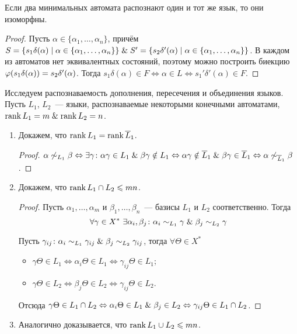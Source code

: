 \begin{statement}
Если два минимальных автомата распознают один и тот же язык, то они изоморфны.
\end{statement}
\begin{proof}
Пусть $\alpha \in \{ \alpha_1, \ldots, \alpha_n \}$, причём $S = \{ s_1 \delta(\alpha) \mid \alpha \in \{ \alpha_1, \ldots, \alpha_n \} \} \opbr\lAnd S' \opbr= \{ s_2 \delta'(\alpha) \mid \alpha \opbr\in \{ \alpha_1, \ldots, \alpha_n \} \}$.
В каждом из автоматов нет эквивалентных состояний, поэтому можно построить биекцию $\varphi(s_1 \delta(\alpha)) \opbr= s_2 \delta'(\alpha)$.
Тогда $s_1 \delta(\alpha) \in F \Leftrightarrow \alpha \in L \Leftrightarrow s_1' \delta'(\alpha) \in F$.
\end{proof}

Исследуем распознаваемость дополнения, пересечения и объединения языков.
Пусть $L_1$, $L_2$~--- языки, распознаваемые некоторыми конечными автоматами, $\operatorname{rank} L_1 = m \mathrel{\&} \operatorname{rank} L_2 = n$.
\begin{enumerate}
	\item Докажем, что $\operatorname{rank} L_1 = \operatorname{rank} \overline L_1$.
	\begin{proof}
	$\alpha \not\sim_{L_1} \beta \Leftrightarrow
	\exists \gamma \colon \alpha \gamma \in L_1 \mathrel{\&} \beta \gamma \notin L_1 \Leftrightarrow
	\alpha \gamma \notin \overline L_1 \mathrel{\&} \beta \gamma \in \overline L_1 \Leftrightarrow
	\alpha \not\sim_{\overline L_1} \beta$.
	\end{proof}
	
	\item Докажем, что $\operatorname{rank} L_1 \cap L_2 \leqslant mn$.
	\begin{proof}
	Пусть $\alpha_1, \ldots, \alpha_m$ и $\beta_1, \ldots, \beta_n$~--- базисы $L_1$ и $L_2$ соответственно.
	Тогда
	\begin{equation*}
	\forall \gamma \in X^* \ \exists \alpha_i, \beta_j \colon \alpha_i \sim_{L_1} \gamma \mathrel{\&} \beta_j \sim_{L_2} \gamma
	\end{equation*}
	
	Пусть $\gamma_{ij} \colon \alpha_i \sim_{L_1} \gamma_{ij} \mathrel{\&} \beta_j \sim_{L_2} \gamma_{ij}$, тогда $\forall \Theta \in X^*$
	\begin{itemize}
		\item $\gamma \Theta \in L_1 \Leftrightarrow
		\alpha_i \Theta \in L_1 \Leftrightarrow
		\gamma_{ij} \Theta \in L_1$;
		\item $\gamma \Theta \in L_2 \Leftrightarrow
		\beta_j \Theta \in L_2 \Leftrightarrow
		\gamma_{ij} \Theta \in L_2$.
	\end{itemize}
	
	Отсюда $\gamma \Theta \in L_1 \cap L_2 \Leftrightarrow
	\alpha_i \Theta \in L_1 \mathrel{\&} \beta_j \in L_2 \Leftrightarrow
	\gamma_{ij} \Theta \in L_1 \cap L_2$.
	\end{proof}
	
	\item Аналогично доказывается, что $\operatorname{rank} L_1 \cup L_2 \leqslant mn$.
\end{enumerate}

